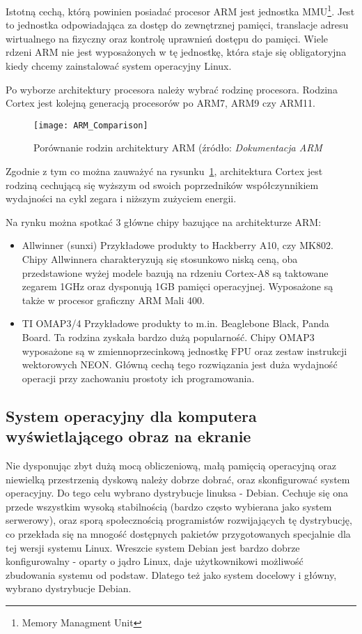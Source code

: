 \par
Istotną cechą, którą powinien posiadać procesor ARM jest jednostka MMU\footnote{Memory Managment Unit}. Jest to jednostka odpowiadająca za dostęp do zewnętrznej pamięci, translacje adresu wirtualnego na fizyczny oraz kontrolę uprawnień dostępu do pamięci. Wiele rdzeni ARM nie jest wyposażonych w tę jednostkę, która staje się obligatoryjna kiedy chcemy zainstalować system operacyjny Linux. 
\par

Po wyborze architektury procesora należy wybrać rodzinę procesora. Rodzina Cortex jest kolejną generacją procesorów po ARM7, ARM9 czy ARM11.

\begin{figure}
\begin{center}
	\texttt{[image: ARM\_Comparison]}
\end{center}
\caption{Porównanie rodzin architektury ARM (źródło: \emph{Dokumentacja ARM} \cite{arm-mmu}}
\label{fig:ARM_Comp}
\end{figure}

Zgodnie z tym co można zauważyć na rysunku~\ref{fig:ARM_Comp}, architektura Cortex jest rodziną cechującą się wyższym od swoich poprzedników współczynnikiem wydajności na cykl zegara i niższym zużyciem energii.

Na rynku można spotkać 3 główne chipy bazujące na architekturze ARM:
\begin{itemize}
	\item Allwinner (sunxi)
	Przykładowe produkty to Hackberry A10, czy MK802. Chipy Allwinnera charakteryzują się stosunkowo niską ceną, oba przedstawione wyżej modele bazują na rdzeniu Cortex-A8 są taktowane zegarem 1GHz oraz dysponują 1GB pamięci operacyjnej. Wyposażone są także w procesor graficzny ARM Mali 400.
	\item TI OMAP3/4
	Przykładowe produkty to m.in. Beaglebone Black, Panda Board. Ta rodzina zyskała bardzo dużą popularność. Chipy OMAP3 wyposażone są w zmiennoprzecinkową jednostkę FPU oraz zestaw instrukcji wektorowych NEON. Główną cechą tego rozwiązania jest duża wydajność operacji przy zachowaniu prostoty ich programowania.
\end{itemize}

\subsection{System operacyjny dla komputera wyświetlającego obraz na ekranie}

Nie dysponując zbyt dużą mocą obliczeniową, małą pamięcią operacyjną oraz niewielką przestrzenią dyskową należy dobrze dobrać, oraz skonfigurować system operacyjny. Do tego celu wybrano dystrybucje linuksa - Debian. Cechuje się ona przede wszystkim wysoką stabilnością (bardzo często wybierana jako system serwerowy), oraz sporą społecznością programistów rozwijających tę dystrybucję, co przekłada się na mnogość dostępnych pakietów przygotowanych specjalnie dla tej wersji systemu Linux. Wreszcie system Debian jest bardzo dobrze konfigurowalny - oparty o jądro Linux, daje użytkownikowi możliwość zbudowania systemu od podstaw. Dlatego też jako system docelowy i główny, wybrano dystrybucje Debian.

